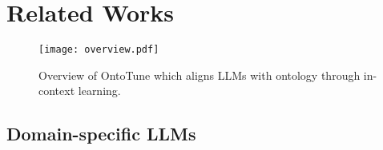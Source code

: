 \section{Related Works}

\begin{figure*}[ht]
\centering
\texttt{[image: overview.pdf]}
\vspace{-6mm}
\caption{Overview of OntoTune which aligns LLMs with ontology through in-context learning.}
\label{fig:method}
\end{figure*}

\subsection{Domain-specific LLMs}
